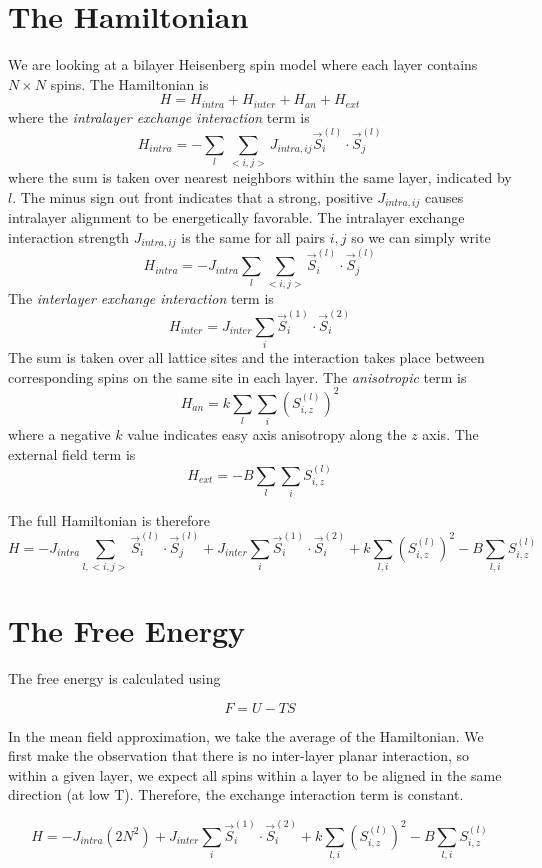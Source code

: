 \documentclass{article}
\begin{document}
\section{The Hamiltonian}
We are looking at a bilayer Heisenberg spin model where each layer contains $N\times N$ spins. The
Hamiltonian is
\begin{equation}
  H = H_{intra} + H_{inter} + H_{an} + H_{ext}
\end{equation}
where the \emph{intralayer exchange interaction} term is
$$ H_{intra} = -\sum_{l}\sum_{<i,j>}J_{intra,ij}\vec{S}_{i}^{(l)}\cdot \vec{S}_{j}^{(l)}$$
where the sum is taken over nearest neighbors within the same
layer, indicated by $l$. The minus sign out front indicates that a strong, positive $J_{intra, ij}$
causes intralayer alignment to be energetically favorable.
The intralayer exchange interaction strength $J_{intra,ij}$ is the same for all
pairs $i,j$ so we can simply write
$$ H_{intra} = -J_{intra}\sum_{l}\sum_{<i,j>}\vec{S}_{i}^{(l)}\cdot \vec{S}_{j}^{(l)}$$
The \emph{interlayer exchange interaction} term is
$$ H_{inter} = J_{inter}\sum_{i}\vec{S}_{i}^{(1)} \cdot \vec{S}_{i}^{(2)}$$
The sum is taken over all lattice sites and the interaction takes place between corresponding
spins on the same site in each layer.
The \emph{anisotropic} term is
$$H_{an} = k\sum_{l}\sum_{i}\left (S_{i,z}^{(l)}\right )^{2}$$
where a negative $k$ value indicates easy axis anisotropy along the $z$ axis.
The external field term is
$$H_{ext} = -B\sum_{l}\sum_{i}S_{i,z}^{(l)}$$

The full Hamiltonian is therefore
$$\boxed{H = -J_{intra}\sum_{l,<i,j>}\vec{S}_{i}^{(l)}\cdot \vec{S}_{j}^{(l)} + J_{inter}\sum_{i}\vec{S}_{i}^{(1)} \cdot \vec{S}_{i}^{(2)} + k\sum_{l,i}\left (S_{i,z}^{(l)}\right )^{2} - B \sum_{l,i}S_{i,z}^{(l)}}$$

\section{The Free Energy}
The free energy is calculated using

$$F = U - TS$$

In the mean field approximation, we take the average of the Hamiltonian. We first make the observation
that there is no inter-layer planar interaction, so within a given layer, we expect all spins within a layer
to be aligned in the same direction (at low T). Therefore, the exchange interaction term is constant.

$$H = -J_{intra}(2N^{2})+ J_{inter}\sum_{i}\vec{S}_{i}^{(1)} \cdot \vec{S}_{i}^{(2)} + k\sum_{l,i}\left (S_{i,z}^{(l)}\right )^{2} - B \sum_{l,i}S_{i,z}^{(l)}$$
\end{document}
